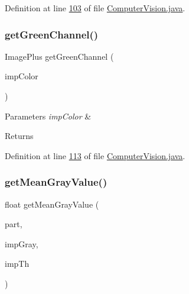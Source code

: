 Definition at line \hyperlink{_computer_vision_8java_source_l00103}{103} of file \hyperlink{_computer_vision_8java_source}{Computer\+Vision.\+java}.

\hypertarget{classfunctions_1_1_computer_vision_a42b101d8bd6c2d64f663411074910dde}{}\label{classfunctions_1_1_computer_vision_a42b101d8bd6c2d64f663411074910dde} 
\subsubsection{\texorpdfstring{get\+Green\+Channel()}{getGreenChannel()}}
{\footnotesize\ttfamily Image\+Plus get\+Green\+Channel (\begin{DoxyParamCaption}\item[{Image\+Plus}]{imp\+Color }\end{DoxyParamCaption})}


\begin{DoxyParams}{Parameters}
{\em imp\+Color} & \\
\hline
\end{DoxyParams}
\begin{DoxyReturn}{Returns}

\end{DoxyReturn}


Definition at line \hyperlink{_computer_vision_8java_source_l00113}{113} of file \hyperlink{_computer_vision_8java_source}{Computer\+Vision.\+java}.

\hypertarget{classfunctions_1_1_computer_vision_af9a3285b7e044506df25989c9f718308}{}\label{classfunctions_1_1_computer_vision_af9a3285b7e044506df25989c9f718308} 
\subsubsection{\texorpdfstring{get\+Mean\+Gray\+Value()}{getMeanGrayValue()}}
{\footnotesize\ttfamily float get\+Mean\+Gray\+Value (\begin{DoxyParamCaption}\item[{\hyperlink{classdata_1_1_spermatozoon}{Spermatozoon}}]{part,  }\item[{Image\+Plus}]{imp\+Gray,  }\item[{Image\+Plus}]{imp\+Th }\end{DoxyParamCaption})}


